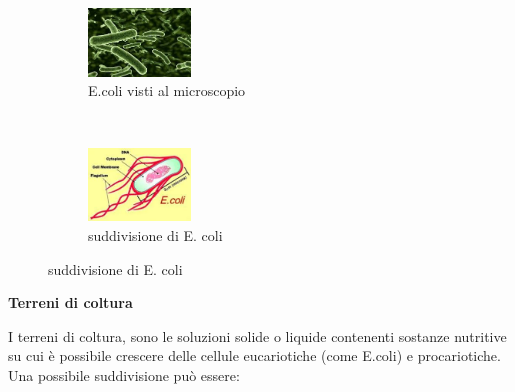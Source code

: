 \begin{figure}[H]
  \centering

  \begin{subfigure}[b]{1\textwidth}
    \centering
    \includegraphics[width=0.3\textwidth]{./immagini/e_coli.jpeg}
    \caption{E.coli visti al microscopio}

  \end{subfigure}

  ~

  \begin{subfigure}[b]{1\textwidth}
    \centering
    \includegraphics[width=0.3\textwidth]{./immagini/e_coli1.jpeg}
    \caption{suddivisione di E. coli}

  \end{subfigure}

  \label{e_coli}

\end{figure}

\textbf{Terreni di coltura}
\vspace{0.3cm}

I terreni di coltura, sono le soluzioni solide o liquide contenenti sostanze
nutritive su cui è possibile crescere delle cellule eucariotiche (come E.coli) e procariotiche.
Una possibile suddivisione può essere:

